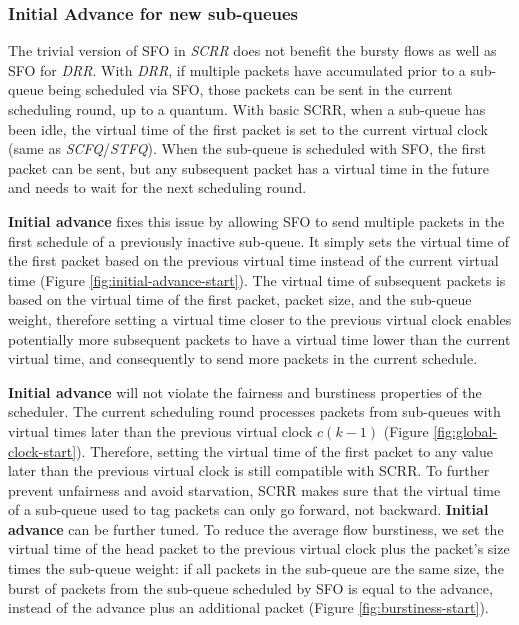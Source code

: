 


\subsubsection{Initial Advance for new sub-queues}
\label{sub:initial-advance}

The trivial version of SFO in \textit{SCRR} does not benefit the bursty flows as
well as SFO for \textit{DRR}. With \textit{DRR}, if multiple packets have accumulated
prior to a sub-queue being scheduled via SFO, those packets can be sent
in the current scheduling round, up to a quantum. With basic SCRR, when
a sub-queue has been idle, the virtual time of the first packet is set
to the current virtual clock (same as \textit{SCFQ}/\textit{STFQ}). When the sub-queue is
scheduled with SFO, the first packet can be sent, but any subsequent
packet has a virtual time in the future and needs to wait for the next
scheduling round.

\textbf{Initial advance} fixes this issue by allowing SFO to send
multiple packets in the first schedule of a previously inactive
sub-queue. It simply sets the virtual time of the first
packet based on the previous virtual time instead of the current
virtual time (Figure \ref{fig:initial-advance-start}). The virtual time
of subsequent packets is based on the virtual time of the first packet, packet size, and the sub-queue weight, therefore setting a virtual time closer to the
previous virtual clock enables potentially more subsequent packets to
have a virtual time lower than the current virtual time, and
consequently to send more packets in the current schedule.

\textbf{Initial advance} will not violate the fairness and burstiness
properties of the scheduler. The current scheduling round processes
packets from sub-queues with virtual times later than the previous
virtual clock $c(k-1)$ (Figure \ref{fig:global-clock-start}). Therefore,
setting the virtual time of the first packet to any value later than
the previous virtual clock is still compatible with SCRR. To further prevent
unfairness and avoid starvation, SCRR makes sure that the virtual time
of a sub-queue used to tag packets can only go forward, not backward.
\textbf{Initial advance} can be further tuned. To reduce the average flow burstiness,  we set the virtual
time of the head packet to the previous virtual clock plus the packet's size times the sub-queue weight: 
if all packets in the sub-queue are the same size, the burst of
packets from the sub-queue scheduled by SFO is equal to the advance,
instead of the advance plus an additional packet 
(Figure \ref{fig:burstiness-start}).

